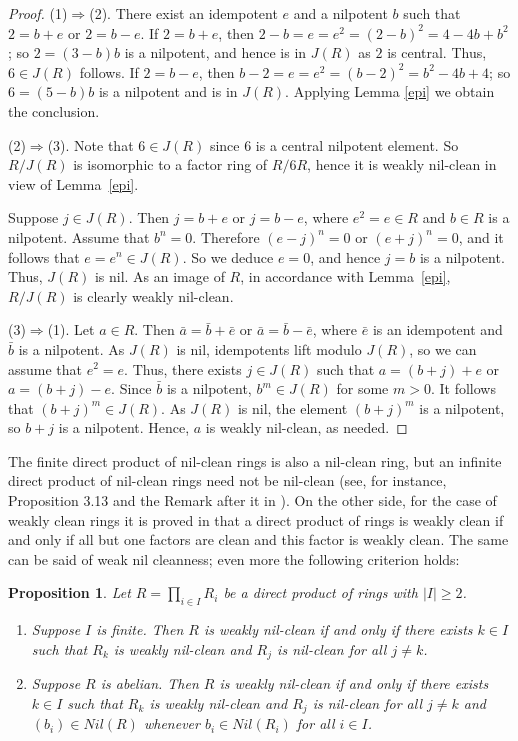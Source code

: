 \documentclass[12]{amsart}
\newtheorem{prop}[thm]{Proposition}
\theoremstyle{definition}
\numberwithin{equation}{section}
\begin{document}
\begin{proof}
(1)$\Rightarrow$(2). There exist an idempotent $e$ and a nilpotent $b$ such that $2=b+e$ or $2=b-e$. If $2=b+e$, then $2-b=e=e^2=(2-b)^2=4-4b+b^2$; so $2=(3-b)b$ is a nilpotent, and hence is in $J(R)$ as $2$ is central. Thus, $6\in J(R)$ follows. If $2=b-e$, then $b-2=e=e^2=(b-2)^2=b^2-4b+4$; so $6=(5-b)b$ is a nilpotent and is in $J(R)$. Applying Lemma \ref{epi} we obtain the conclusion.

(2)$\Rightarrow$(3). Note that $6\in J(R)$ since $6$ is a central nilpotent element. So $R/J(R)$ is isomorphic
to a factor ring of $R/6R$, hence it is weakly nil-clean in view of Lemma~\ref{epi}.

Suppose $j\in J(R)$. Then $j=b+e$ or $j=b-e$, where $e^2=e\in R$ and $b\in R$ is a nilpotent.
Assume that $b^n=0$. Therefore $(e-j)^n=0$ or $(e+j)^n=0$, and it follows that $e=e^n\in J(R)$. So we deduce $e=0$, and hence $j=b$ is a nilpotent. Thus, $J(R)$ is nil. As an image of $R$, in accordance with Lemma~\ref{epi}, $R/J(R)$ is clearly weakly nil-clean.

(3)$\Rightarrow$(1). Let $a\in R$. Then $\bar a =\bar b+\bar e$ or $\bar a=\bar b-\bar e$, where $\bar e$ is an idempotent and $\bar b$ is a nilpotent. As $J(R)$ is nil, idempotents lift modulo $J(R)$, so we can assume that $e^2=e$. Thus, there exists $j\in J(R)$ such that $a=(b+j)+e$ or $a=(b+j)-e$. Since $\bar b$ is a nilpotent, $b^m\in J(R)$ for some $m>0$. It follows that $(b+j)^m\in J(R)$. As $J(R)$ is nil, the element $(b+j)^m$ is a nilpotent, so $b+j$ is a nilpotent. Hence, $a$ is weakly nil-clean, as needed.
\end{proof}

The finite direct product of nil-clean rings is also a nil-clean ring, but an infinite direct product of nil-clean rings need not be nil-clean (see, for instance, Proposition 3.13 and the Remark after it in \cite{D13}). On the other side, for the case of weakly clean rings it is proved in \cite{AA06} that a direct product of rings is weakly clean if and only if all but one factors are clean and this factor is weakly clean. The same can be said of weak nil cleanness; even more the following criterion holds:

\begin{prop}\label{prod}
Let $R=\prod _{i\in I}R_i$ be a direct product of rings with $|I|\ge 2$.
\begin{enumerate}
\item Suppose $I$ is finite. Then $R$ is weakly nil-clean if and only if there exists $k\in I$ such that $R_k$ is weakly nil-clean and $R_j$ is nil-clean for all $j\not= k$.

\item Suppose $R$ is abelian. Then
$R$ is weakly nil-clean if and only if there exists $k\in I$ such that $R_k$ is weakly nil-clean and $R_j$ is nil-clean for all $j\not= k$ and $(b_i)\in Nil(R)$ whenever $b_i\in Nil(R_i)$ for all $i\in I$.

\end{enumerate}
\end{prop}
\end{document}
